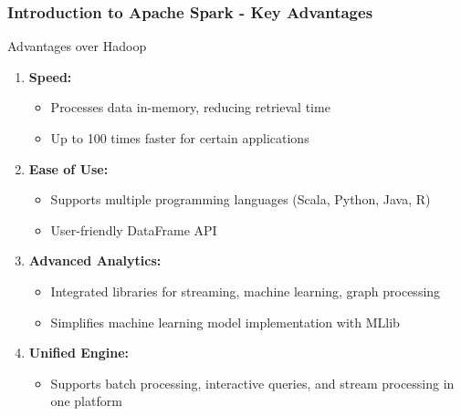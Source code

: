 \documentclass[aspectratio=169]{beamer}
\begin{document}
\begin{frame}[fragile]
    \frametitle{Introduction to Apache Spark - Key Advantages}
    \begin{block}{Advantages over Hadoop}
        \begin{enumerate}
            \item \textbf{Speed:}
                \begin{itemize}
                    \item Processes data in-memory, reducing retrieval time
                    \item Up to 100 times faster for certain applications
                \end{itemize}
            \item \textbf{Ease of Use:}
                \begin{itemize}
                    \item Supports multiple programming languages (Scala, Python, Java, R)
                    \item User-friendly DataFrame API
                \end{itemize}
            \item \textbf{Advanced Analytics:}
                \begin{itemize}
                    \item Integrated libraries for streaming, machine learning, graph processing
                    \item Simplifies machine learning model implementation with MLlib
                \end{itemize}
            \item \textbf{Unified Engine:}
                \begin{itemize}
                    \item Supports batch processing, interactive queries, and stream processing in one platform
                \end{itemize}
        \end{enumerate}
    \end{block}
\end{frame}
\end{document}
